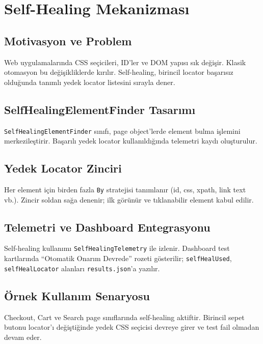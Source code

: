 \chapter{Self-Healing Mekanizması}

\section{Motivasyon ve Problem}
Web uygulamalarında CSS seçicileri, ID'ler ve DOM yapısı sık değişir. Klasik otomasyon bu değişikliklerde kırılır. Self-healing, birincil locator başarısız olduğunda tanımlı yedek locator listesini sırayla dener.

\section{SelfHealingElementFinder Tasarımı}
\texttt{SelfHealingElementFinder} sınıfı, page object'lerde element bulma işlemini merkezileştirir. Başarılı yedek locator kullanıldığında telemetri kaydı oluşturulur.

\section{Yedek Locator Zinciri}
Her element için birden fazla \texttt{By} stratejisi tanımlanır (id, css, xpath, link text vb.). Zincir soldan sağa denenir; ilk görünür ve tıklanabilir element kabul edilir.

\section{Telemetri ve Dashboard Entegrasyonu}
Self-healing kullanımı \texttt{SelfHealingTelemetry} ile izlenir. Dashboard test kartlarında ``Otomatik Onarım Devrede'' rozeti gösterilir; \texttt{selfHealUsed}, \texttt{selfHealLocator} alanları \texttt{results.json}'a yazılır.

\section{Örnek Kullanım Senaryosu}
Checkout, Cart ve Search page sınıflarında self-healing aktiftir. Birincil sepet butonu locator'ı değiştiğinde yedek CSS seçicisi devreye girer ve test fail olmadan devam eder.

